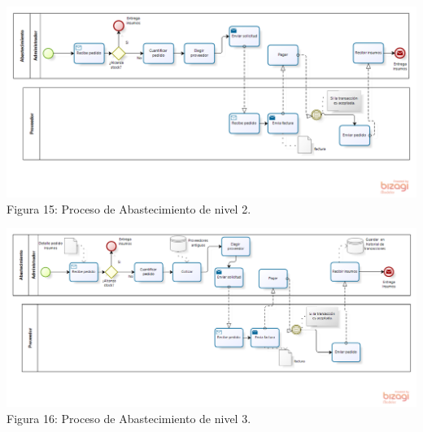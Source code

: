 \begin{itemize}
\begin{center}
\includegraphics[width=15cm]{./imagenes/AbastecimientoN2.png}\\
Figura 15: Proceso de Abastecimiento de nivel 2.
\end{center}

\begin{center}
\includegraphics[width=15cm]{./imagenes/AbastecimientoNT.png}\\
Figura 16: Proceso de Abastecimiento de nivel 3.
\end{center}

\end{itemize}
